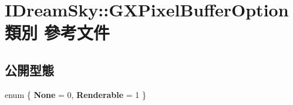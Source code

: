 \hypertarget{class_i_dream_sky_1_1_g_x_pixel_buffer_option}{}\section{I\+Dream\+Sky\+:\+:G\+X\+Pixel\+Buffer\+Option 類別 參考文件}
\label{class_i_dream_sky_1_1_g_x_pixel_buffer_option}
\subsection*{公開型態}
\begin{DoxyCompactItemize}
\item 
enum \{ {\bfseries None} = 0, 
{\bfseries Renderable} = 1
 \}\hypertarget{class_i_dream_sky_1_1_g_x_pixel_buffer_option_abf58a19561d708c90984b8b3b366427b}{}\label{class_i_dream_sky_1_1_g_x_pixel_buffer_option_abf58a19561d708c90984b8b3b366427b}

\end{DoxyCompactItemize}
